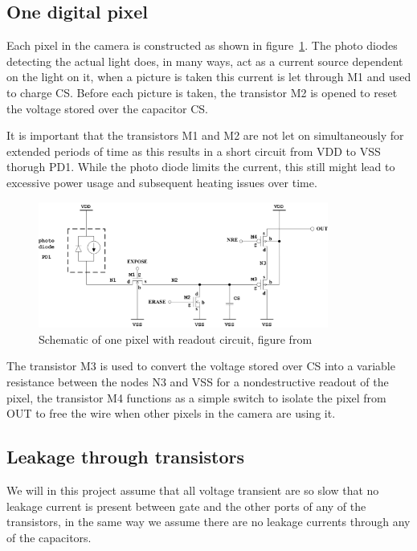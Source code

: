 
\subsection{One digital pixel} \label{sec:oneDigitalPixel}


Each pixel in the camera is constructed as shown in figure~\ref{fig:pixelschematic}.
The photo diodes detecting the actual light does, in many ways, act as a current source dependent on the light on it, when a picture is taken this
current is let through M1 and used to charge CS.
Before each picture is taken, the transistor M2 is opened to reset the voltage stored over the capacitor CS.

It is important that the transistors M1 and M2 are not let on simultaneously for extended periods of time as this results in a short circuit from VDD to VSS thorugh PD1.
While the photo diode limits the current, this still might lead to excessive power usage and subsequent heating issues over time.


\begin{figure}[htbp]
  \centering
  \includegraphics[width=0.85\textwidth]{figures/pixel}
  \caption{Schematic of one pixel with readout circuit, figure from~\cite{oppgave}}\label{fig:pixelschematic}
\end{figure}


The transistor M3 is used to convert the voltage stored over CS into a variable resistance between the nodes N3 and VSS for a nondestructive readout of the pixel,
the transistor M4 functions as a simple switch to isolate the pixel from OUT to free the wire when other pixels in the camera are using it.


\subsection{Leakage through transistors} \label{sec:leakagecurrent}

We will in this project assume that all voltage transient are so slow that no leakage current is present between gate and the other ports of any of the transistors,
in the same way we assume there are no leakage currents through any of the capacitors.

